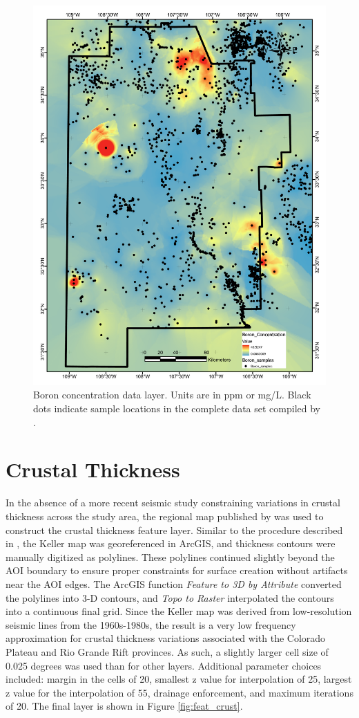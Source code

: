 \begin{figure}[H]
\centering
\includegraphics[width=0.75\linewidth]{templates/images/Figure-Boron.pdf}
\caption[Boron concentration data layer]{Boron concentration data layer. Units are in ppm or mg/L. Black dots indicate sample locations in the complete data set compiled by \protect\citet{bielicki_hydrogeolgic_2015}.}
\label{fig:feat_boron}
\end{figure}
\pagebreak

\section{Crustal Thickness}\label{app:dl_crustal_thickness}
In the absence of a more recent seismic study constraining variations in crustal thickness across the study area, the regional map published by \citet{keller_comparative_1991} was used to construct the crustal thickness feature layer. Similar to the procedure described in \citep{pepin_new_2018}, the Keller map was georeferenced in ArcGIS, and thickness contours were manually digitized as polylines. These polylines continued slightly beyond the AOI boundary to ensure proper constraints for surface creation without artifacts near the AOI edges. The ArcGIS function \textit{Feature to 3D by Attribute} converted the polylines into 3-D contours, and \textit{Topo to Raster} interpolated the contours into a continuous final grid. Since the Keller map was derived from low-resolution seismic lines from the 1960s-1980s, the result is a very low frequency approximation for crustal thickness variations associated with the Colorado Plateau and Rio Grande Rift provinces. As such, a slightly larger cell size of 0.025 degrees was used than for other layers. Additional parameter choices included: margin in the cells of 20, smallest z value for interpolation of 25, largest z value for the interpolation of 55, drainage enforcement, and maximum iterations of 20. The final layer is shown in Figure \ref{fig:feat_crust}.
\vfill
\pagebreak

